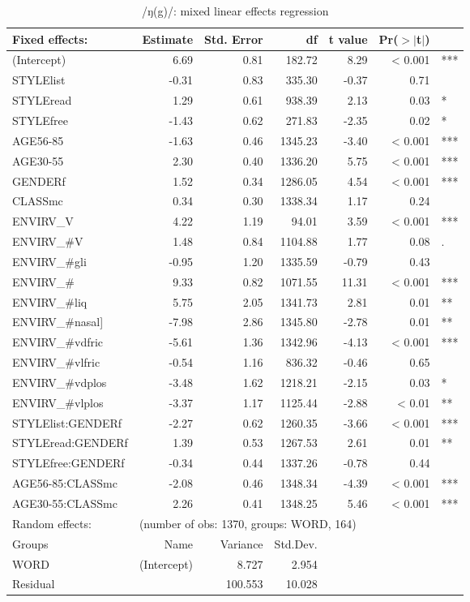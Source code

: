\begin{table}[h]
	\centering
	\footnotesize
	\caption{/ŋ(g)/: mixed linear effects regression}
	\label{tab.regression.ng}
	\begin{tabular}{p{}rrrrrl}
		\toprule
		Fixed effects: & Estimate & Std. Error & df & t value & Pr($>$$|$t$|$) & \\
		\midrule
		(Intercept) & 6.69 & 0.81 & 182.72 & 8.29 & < 0.001 & *** \\ 
		STYLElist & -0.31 & 0.83 & 335.30 & -0.37 & 0.71 & \\ 
		STYLEread & 1.29 & 0.61 & 938.39 & 2.13 & 0.03 & *\\ 
		STYLEfree & -1.43 & 0.62 & 271.83 & -2.35 & 0.02 & *\\ 
		AGE56-85 & -1.63 & 0.46 & 1345.23 & -3.40 & < 0.001 & *** \\ 
		AGE30-55 & 2.30 & 0.40 & 1336.20 & 5.75 & < 0.001 & *** \\ 
		GENDERf & 1.52 & 0.34 & 1286.05 & 4.54 & < 0.001 & *** \\ 
		CLASSmc & 0.34 & 0.30 & 1338.34 & 1.17 & 0.24 & \\ 
		ENVIRV\_V & 4.22 & 1.19 & 94.01 & 3.59 & < 0.001 & *** \\ 
		ENVIRV\_\#V & 1.48 & 0.84 & 1104.88 & 1.77 & 0.08 & . \\ 
		ENVIRV\_\#gli & -0.95 & 1.20 & 1335.59 & -0.79 & 0.43 & \\ 
		ENVIRV\_\# & 9.33 & 0.82 & 1071.55 & 11.31 & < 0.001 & *** \\ 
		ENVIRV\_\#liq & 5.75 & 2.05 & 1341.73 & 2.81 & 0.01 & **\\ 
		ENVIRV\_\#nasal] & -7.98 & 2.86 & 1345.80 & -2.78 & 0.01 & **\\ 
		ENVIRV\_\#vdfric & -5.61 & 1.36 & 1342.96 & -4.13 & < 0.001 & *** \\ 
		ENVIRV\_\#vlfric & -0.54 & 1.16 & 836.32 & -0.46 & 0.65 & \\ 
		ENVIRV\_\#vdplos & -3.48 & 1.62 & 1218.21 & -2.15 & 0.03 & *\\ 
		ENVIRV\_\#vlplos & -3.37 & 1.17 & 1125.44 & -2.88 & < 0.01 & ** \\ 
		STYLElist:GENDERf & -2.27 & 0.62 & 1260.35 & -3.66 & < 0.001 & *** \\ 
		STYLEread:GENDERf & 1.39 & 0.53 & 1267.53 & 2.61 & 0.01 & ** \\ 
		STYLEfree:GENDERf & -0.34 & 0.44 & 1337.26 & -0.78 & 0.44 & \\ 
		AGE56-85:CLASSmc & -2.08 & 0.46 & 1348.34 & -4.39 & < 0.001 & *** \\ 
		AGE30-55:CLASSmc & 2.26 & 0.41 & 1348.25 & 5.46 & < 0.001 & *** \\ 
		\midrule
		Random effects: & \multicolumn{6}{l}{(number of obs: 1370, groups: WORD, 164)} \\
		Groups &         Name & Variance &      Std.Dev. & & & \\
		WORD &  (Intercept) & 8.727 & 2.954 & & & \\
		Residual  &         & 100.553 & 10.028 & & & \\
		\bottomrule
	\end{tabular}
\end{table}

